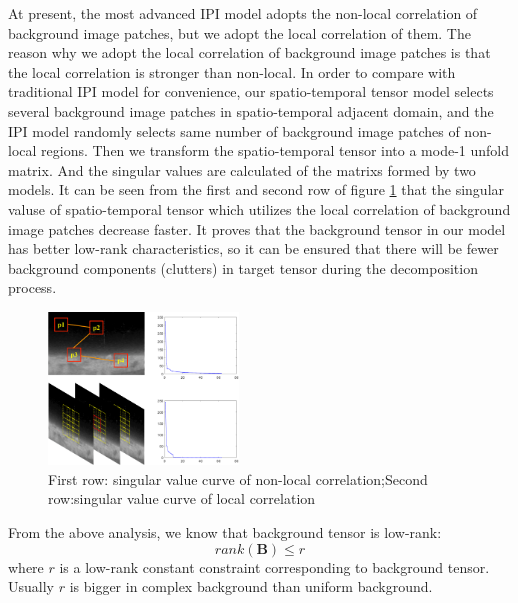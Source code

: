 \documentclass[journal]{IEEEtran}
\begin{document}
At present, the most advanced IPI\cite{gao2013infrared} model adopts the non-local correlation of background image patches, but we adopt the local correlation of them. The reason why we adopt the local correlation of background image patches is that the local correlation is stronger than non-local. In order to compare with traditional IPI model for convenience, our spatio-temporal tensor model selects several background image patches in spatio-temporal adjacent domain, and the IPI model randomly selects same number of background image patches of non-local regions. Then we transform the spatio-temporal tensor into a mode-1 unfold matrix. And the singular values are calculated of the matrixs formed by two models. It can be seen from the first and second row of figure \ref{singular} that the singular valuse of spatio-temporal tensor which utilizes the local correlation of background image patches decrease faster. It proves that the background tensor in our model has better low-rank characteristics, so it can be ensured that there will be fewer background components (clutters) in target tensor during the decomposition process.

\begin{figure}[H]
  \centering
  \includegraphics[width=0.45\textwidth]{singular.eps}
  \caption{First row: singular value curve of non-local correlation;Second row:singular value curve of local correlation}
  \label{singular}
\end{figure}

From the above analysis, we know that background tensor is low-rank:
\begin{equation}
  rank(\bm{B}) \leq r
\end{equation}
where $r$ is a low-rank constant constraint corresponding to background tensor. Usually $r$ is bigger in complex background than uniform background.
\end{document}
